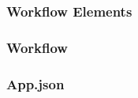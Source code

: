 \subsubsection{Workflow Elements}
\subsubsection{Workflow}
\subsubsection{App.json} \label{subsubsec:mapapps-generated-appjson}
